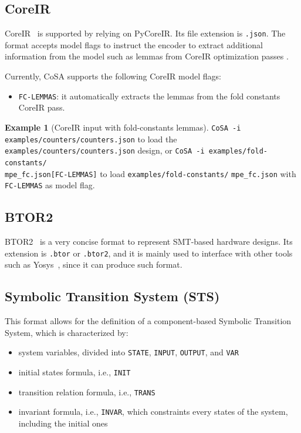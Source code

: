 \documentclass{article}
\theoremstyle{definition}
\newtheorem{example}{Example}[section]
\begin{document}
\subsection{CoreIR}
CoreIR~\cite{CoreIR} is supported by relying on PyCoreIR. Its file
extension is \texttt{.json}. The format accepts model flags to
instruct the encoder to extract additional information from the model
such as lemmas from CoreIR optimization passes \cite{cosa-paper}.

Currently, CoSA supports the following CoreIR model flags:
\begin{itemize}
\item \texttt{FC-LEMMAS}: it automatically extracts the lemmas from
  the fold constants CoreIR pass.
\end{itemize}

\begin{example}[CoreIR input with fold-constants lemmas]
  \texttt{CoSA -i examples/counters/counters.json} to load the
  \texttt{examples/counters/counters.json} design, or \texttt{CoSA -i
    examples/fold-constants/\\mpe\_fc.json[FC-LEMMAS]} to load
  \texttt{examples/fold-constants/} \texttt{mpe\_fc.json} with
  \texttt{FC-LEMMAS} as model flag.
\end{example}

\subsection{BTOR2}
BTOR2~\cite{btormc} is a very concise format to represent SMT-based
hardware designs. Its extension is \texttt{.btor} or \texttt{.btor2},
and it is mainly used to interface with other tools such as
Yosys~\cite{wolf2013yosys}, since it can produce such format.

\subsection{Symbolic Transition System (STS)}

This format allows for the definition of a component-based Symbolic
Transition System, which is characterized by:

\begin{itemize}
\item system variables, divided into \texttt{STATE}, \texttt{INPUT},
  \texttt{OUTPUT}, and \texttt{VAR}
\item initial states formula, i.e., \texttt{INIT}
\item transition relation formula, i.e., \texttt{TRANS}
\item invariant formula, i.e., \texttt{INVAR}, which constraints every
  states of the system, including the initial ones
\end{itemize}
\end{document}
